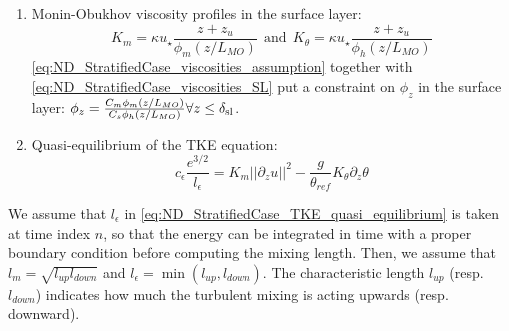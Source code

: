 \begin{enumerate}
\item
	Monin-Obukhov viscosity profiles in the surface layer:
\begin{equation}
	\label{eq:ND_StratifiedCase_viscosities_SL}
	K_m = \kappa u_\star\frac{z+ z_{u}}{\phi_m(z/L_{MO})} ~~\text{and}~~
K_\theta = \kappa u_\star\frac{z+ z_{u}}{\phi_h(z/L_{MO})}
\end{equation}
\eqref{eq:ND_StratifiedCase_viscosities_assumption}
together with \eqref{eq:ND_StratifiedCase_viscosities_SL} put
a constraint on $\phi_z$ in the surface layer:
$\phi_z = \frac{C_m\phi_m(z/L_{MO})}{C_s\phi_h(z/L_{MO})}
		\forall z\leq \delta_{\rm sl}$.
\item Quasi-equilibrium of the TKE equation:
\begin{equation}
	\label{eq:ND_StratifiedCase_TKE_quasi_equilibrium}
	c_\epsilon \frac{e^{3/2}}{l_\epsilon}=K_m ||\partial_z u||^2 - \frac{g}{\theta_{ref}} K_\theta \partial_z \theta
\end{equation}
\end{enumerate}
We assume that $l_\epsilon$ in
\eqref{eq:ND_StratifiedCase_TKE_quasi_equilibrium} is taken at
time index $n$, so that the energy can be integrated in time
with a proper boundary condition before computing the mixing
length. Then, we assume that $l_m = \sqrt{l_{up}l_{down}}$ and
$l_\epsilon = \min(l_{up}, l_{down})$.
The characteristic length $l_{up}$ (resp. $l_{down}$) indicates
how much the turbulent mixing is acting upwards (resp. downward).
